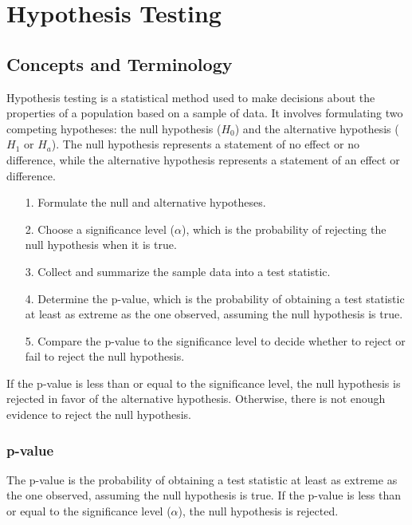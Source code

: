 \section{Hypothesis Testing}\label{Hypothesis Testing}

\subsection{Concepts and Terminology}\label{Concepts and Terminology}

Hypothesis testing is a statistical method used to make decisions about the properties of a population based on a sample of data. It involves formulating two competing hypotheses: the null hypothesis (\(H_0\)) and the alternative hypothesis (\(H_1\) or \(H_a\)). The null hypothesis represents a statement of no effect or no difference, while the alternative hypothesis represents a statement of an effect or difference.
\begin{enumerate}
    \item [1.] Formulate the null and alternative hypotheses.
    \item [2.] Choose a significance level (\(\alpha\)), which is the probability of rejecting the null hypothesis when it is true.
    \item [3.] Collect and summarize the sample data into a test statistic.
    \item [4.] Determine the p-value, which is the probability of obtaining a test statistic at least as extreme as the one observed, assuming the null hypothesis is true.
    \item [5.] Compare the p-value to the significance level to decide whether to reject or fail to reject the null hypothesis.
\end{enumerate}
    
If the p-value is less than or equal to the significance level, the null hypothesis is rejected in favor of the alternative hypothesis. Otherwise, there is not enough evidence to reject the null hypothesis.

\subsubsection{p-value}
The p-value is the probability of obtaining a test statistic at least as extreme as the one observed, assuming the null hypothesis is true. If the p-value is less than or equal to the significance level (\(\alpha\)), the null hypothesis is rejected.

